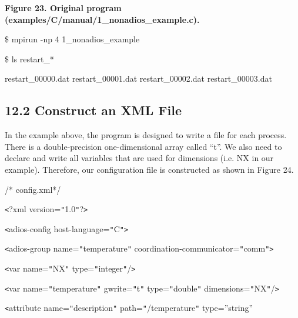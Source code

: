 \vspace{22pt}
\leftskip=18pt
{\color{color20} \textbf{Figure 23. Original program (examples/C/manual/1\_nonadios\_example.c).}}

\vspace{10pt}
\leftskip=0pt
\$ mpirun -np 4 1\_nonadios\_example

\vspace{10pt}
\$ ls restart\_*

\vspace{10pt}
restart\_00000.dat  restart\_00001.dat  restart\_00002.dat  restart\_00003.dat\label{HToc84890292}\label{HToc212016668}\label{HToc212016910}\label{HToc182553441}

\vspace{22pt}
\subsection*{{\large 12.2 }{\large \textbf{Construct an XML File }}}

\vspace{10pt}
In the example above, the program is designed to write a file for each process. 
There is a double-precision one-dimensional array called ``t''. We also need to 
declare and write all variables that are used for dimensions (i.e. NX in our example). 
Therefore, our configuration file is constructed as shown in Figure 24.

\vspace{22pt}
/* config.xml*/

\vspace{10pt}
\texttt{<}?xml version=\texttt{"}1.0\texttt{"}?\texttt{>}

\vspace{10pt}
\texttt{<}adios-config host-language=\texttt{"}C\texttt{"}\texttt{>}

\vspace{10pt}
\parindent=14pt
\texttt{<}adios-group name=\texttt{"}temperature\texttt{"} coordination-communicator=\texttt{"}comm\texttt{"}\texttt{>}

\vspace{10pt}
\parindent=28pt
\texttt{<}var name=\texttt{"}NX\texttt{"} type=\texttt{"}integer\texttt{"}/\texttt{>}

\vspace{10pt}
\texttt{<}var name=\texttt{"}temperature\texttt{"} gwrite=\texttt{"}t\texttt{"} 
type=\texttt{"}double\texttt{"} dimensions=\texttt{"}NX\texttt{"}/\texttt{>}

\vspace{10pt}
\parindent=10pt
\texttt{<}attribute name=\texttt{"}description\texttt{"} path=\texttt{"}/temperature\texttt{"} 
 type=''string''

